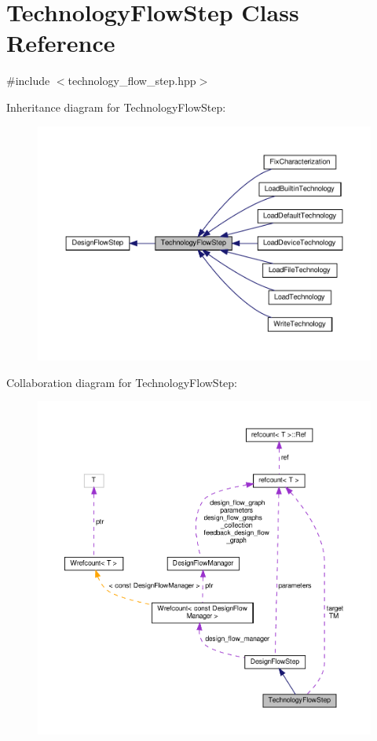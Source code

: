 \hypertarget{classTechnologyFlowStep}{}\section{Technology\+Flow\+Step Class Reference}
\label{classTechnologyFlowStep}


{\ttfamily \#include $<$technology\+\_\+flow\+\_\+step.\+hpp$>$}



Inheritance diagram for Technology\+Flow\+Step\+:
\nopagebreak
\begin{figure}[H]
\begin{center}
\leavevmode
\includegraphics[width=350pt]{dd/d60/classTechnologyFlowStep__inherit__graph}
\end{center}
\end{figure}


Collaboration diagram for Technology\+Flow\+Step\+:
\nopagebreak
\begin{figure}[H]
\begin{center}
\leavevmode
\includegraphics[width=350pt]{d5/d80/classTechnologyFlowStep__coll__graph}
\end{center}
\end{figure}
